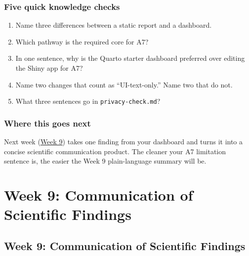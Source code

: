\documentclass[
  letterpaper,
  DIV=11,
  numbers=noendperiod,
  oneside]{scrreprt}
\providecommand{\tightlist}{%
  \setlength{\itemsep}{0pt}\setlength{\parskip}{0pt}}
\begin{document}
\section*{Five quick knowledge
checks}\label{five-quick-knowledge-checks-2}


\begin{enumerate}
\def\labelenumi{\arabic{enumi}.}
\tightlist
\item
  Name three differences between a static report and a dashboard.
\item
  Which pathway is the required core for A7?
\item
  In one sentence, why is the Quarto starter dashboard preferred over
  editing the Shiny app for A7?
\item
  Name two changes that count as ``UI-text-only.'' Name two that do not.
\item
  What three sentences go in \texttt{privacy-check.md}?
\end{enumerate}

\section*{Where this goes next}\label{where-this-goes-next-20}


Next week (\href{../week09-science-communication/index.qmd}{Week 9})
takes one finding from your dashboard and turns it into a concise
scientific communication product. The cleaner your A7 limitation
sentence is, the easier the Week 9 plain-language summary will be.

\part{Week 9: Communication of Scientific Findings}

\chapter*{Week 9: Communication of Scientific
Findings}\label{week-9-communication-of-scientific-findings-1}

\end{document}
